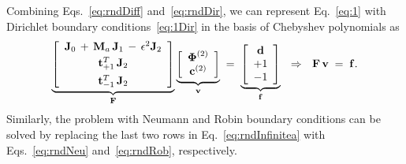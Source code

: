 \documentclass[%
secnumarabic,%
 amssymb, amsmath,%
 aps,prf,superscriptaddress,longbibliography
frontmatterverbose,
]{revtex4-2}
\begin{document}
Combining Eqs.~\eqref{eq:rndDiff} and~\eqref{eq:rndDir}, we can represent Eq.~\eqref{eq:1} with Dirichlet boundary conditions~\eqref{eq:1Dir} in the basis of Chebyshev polynomials as
\begin{equation}
\underbrace{\left[\begin{array}{ccc}
   \mathbf J_0 \,+\, {\mathbf M}_a \, \mathbf J_1\, - \, \epsilon^2 \mathbf J_2 \\[0.1cm]
    \mathbf t_{+1}^T \, \mathbf J_2 \\[0.15cm]
    \mathbf t_{-1}^T \, \mathbf J_2
  \end{array}\right]}_{\mathbf{F}}\underbrace{\left[\begin{array}{c}
    \boldsymbol \Phi^{(2)} \\
    \mathbf c^{(2)}
  \end{array}\right]}_{\mathbf{v}} 
  \;=\; 
  \underbrace{\left[\begin{array}{c}
  \mathbf d\\
  +1\\
  -1
  \end{array}\right]}_{\mathbf{f}}
  ~~\Rightarrow ~~
  \mathbf{F}\, \mathbf{v} \;=\; \mathbf{f}.
  \label{eq:rndInfinitea}
\end{equation}
Similarly, the problem with Neumann and Robin boundary conditions can be solved by replacing the last two rows in Eq.~\eqref{eq:rndInfinitea} with Eqs.~\eqref{eq:rndNeu} and~\eqref{eq:rndRob}, respectively.
\end{document}
